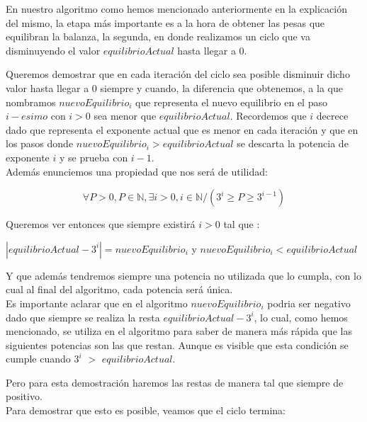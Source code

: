 
En nuestro algoritmo como hemos mencionado anteriormente en la explicaci\'on del mismo, la etapa m\'as importante es a la hora de obtener las pesas que equilibran la balanza, la segunda, en donde realizamos un ciclo que va disminuyendo el valor $equilibrioActual$ hasta llegar a 0. 

Queremos demostrar que en cada iteraci\'on del ciclo sea posible disminuir dicho valor hasta llegar a 0 siempre y cuando, la diferencia que obtenemos, a la que nombramos $nuevoEquilibrio_{i}$ que representa el nuevo equilibrio en el paso $i-esimo$ con $i > 0$ sea menor que $equilibrioActual$. Recordemos que $i$ decrece dado que representa el exponente actual que es menor en cada iteración y que en los pasos donde $nuevoEquilibrio_{i} > equilibrioActual$  se descarta	 la potencia de exponente $i$ y se prueba con $i-1$.\\

Además enunciemos una propiedad que nos será de utilidad:

\begin{equation}
\forall P > 0, P \in \mathbb{N}, \exists i > 0, i \in \mathbb{N} / (3^i \geq P \geq 3^{i-1})  
\end{equation} \label{eq:prop}

Queremos ver entonces que siempre existirá $i > 0$ tal que :\\

\begin{center}
$|equilibrioActual - {3^i}| = nuevoEquilibrio_{i}$ y $nuevoEquilibrio_{i} < equilibrioActual$\\ 
\end{center}


Y que además tendremos siempre una potencia no utilizada que lo cumpla, con lo cual al final del algoritmo, cada potencia será única.\\ 

Es importante aclarar que en el algoritmo $nuevoEquilibrio_{i}$ podria ser negativo dado que siempre se realiza la resta $equilibrioActual - {3^i}$, lo cual, como hemos mencionado, se utiliza en el algoritmo para saber de manera más rápida que las siguientes potencias son las que restan. Aunque es visible que esta condición se cumple cuando ${3^i}$ $>$ $equilibrioActual$. 
  
Pero para esta demostración haremos las restas de manera tal que siempre de positivo.\\ 
 
Para demostrar que esto es posible, veamos que el ciclo termina:\\ 

